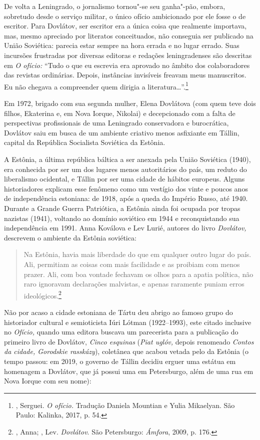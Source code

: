 De volta a Leningrado, o jornalismo tornou"-se seu ganha"-pão, embora,
sobretudo desde o serviço militar, o único ofício ambicionado por ele
fosse o de escritor. Para Dovlátov, ser escritor era a única coisa que
realmente importava, mas, mesmo apreciado por literatos conceituados,
não conseguia ser publicado na União Soviética: parecia estar sempre na
hora errada e no lugar errado. Suas incursões frustradas por diversas
editoras e redações leningradenses são descritas em \emph{O ofício:}
``Tudo o que eu escrevia era aprovado no âmbito dos colaboradores das
revistas ordinárias. Depois, instâncias invi­síveis freavam meus
manuscritos. Eu não chegava a compreen­der quem dirigia a
literatura\ldots{}''.\footnote{, Serguei. \emph{O ofício.} Tradução
  Daniela Mountian e Yulia Mikaelyan. São Paulo: Kalinka, 2017, p. 54.}

Em 1972, brigado com sua segunda mulher, Elena Dovlátova (com quem teve
dois filhos, Ekaterina e, em Nova Iorque, Nikolai) e decepcionado com a
falta de perspectivas profissionais de uma Leningrado conservadora e
burocrática, Dovlátov saiu em busca de um ambiente criativo
menos asfixiante em Tállin, capital da República Socialista Soviética da
Estônia.

A Estônia, a última república báltica a ser anexada pela União Soviética
(1940), era conhecida por ser um dos lugares menos autoritários do país,
um reduto do liberalismo ocidental, e Tállin por ser uma cidade de
hábitos europeus. Alguns historiadores explicam esse fenômeno como um
vestígio dos vinte e poucos anos de independência estoniana: de 1918,
após a queda do Império Russo, até 1940. Durante a Grande Guerra
Patriótica, a Estônia ainda foi ocupada por tropas nazistas (1941),
voltando ao domínio soviético em 1944 e reconquistando sua independência
em 1991. Anna Koválova e Lev Lurié, autores do livro \emph{Dovlátov,}
descrevem o ambiente da Estônia soviética:

\begin{quotation}
Na Estônia, havia mais liberdade do que em qualquer outro lugar do país.
Ali, permitiam as coisas com mais facilidade e as proibiam com menos
prazer. Ali, com boa vontade fechavam os olhos para a apatia política,
não raro ignoravam declarações malvistas, e apenas raramente puniam
erros ideológicos.\footnote{, Anna; , Lev. \emph{Dovlátov}.
  São Petersburgo: \emph{Ámfora}, 2009, p. 176.}
\end{quotation}

Não por acaso a cidade estoniana de Tártu deu abrigo ao famoso grupo do
historiador cultural e semioticista Iúri Lótman (1922--1993), este
citado inclusive no \emph{Ofício,} quando uma editora buscava um
parecerista para a publicação do primeiro livro de Dovlátov, \emph{Cinco
esquinas} (\emph{Piat uglóv,} depois renomeado \emph{Contos da cidade,
Gorodskie rasskázy}), coletânea que acabou vetada pelo  da
Estônia (o tempo passou: em 2019, o governo de Tállin decidiu erguer uma
estátua em homenagem a Dovlátov, que já possui uma em Petersburgo, além
de uma rua em Nova Iorque com seu nome):

